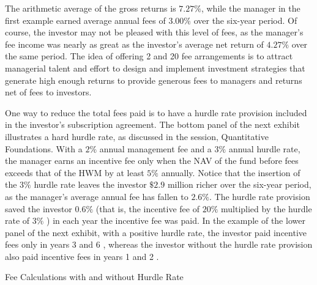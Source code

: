 \documentclass[11pt]{article}
\begin{document}
The arithmetic average of the gross returns is $7.27 \%$, while the manager in the first example earned average annual fees of $3.00 \%$ over the six-year period. Of course, the investor may not be pleased with this level of fees, as the manager's fee income was nearly as great as the investor's average net return of $4.27 \%$ over the same period. The idea of offering 2 and 20 fee arrangements is to attract managerial talent and effort to design and implement investment strategies that generate high enough returns to provide generous fees to managers and returns net of fees to investors.

One way to reduce the total fees paid is to have a hurdle rate provision included in the investor's subscription agreement. The bottom panel of the next exhibit illustrates a hard hurdle rate, as discussed in the session, Quantitative Foundations. With a $2 \%$ annual management fee and a $3 \%$ annual hurdle rate, the manager earns an incentive fee only when the NAV of the fund before fees exceeds that of the HWM by at least $5 \%$ annually. Notice that the insertion of the $3 \%$ hurdle rate leaves the investor $\$ 2.9$ million richer over the six-year period, as the manager's average annual fee has fallen to $2.6 \%$. The hurdle rate provision saved the investor $0.6 \%$ (that is, the incentive fee of $20 \%$ multiplied by the hurdle rate of $3 \%$ ) in each year the incentive fee was paid. In the example of the lower panel of the next exhibit, with a positive hurdle rate, the investor paid incentive fees only in years 3 and 6 , whereas the investor without the hurdle rate provision also paid incentive fees in years 1 and 2 .

Fee Calculations with and without Hurdle Rate
\end{document}
